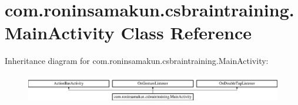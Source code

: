 \section{com.\+roninsamakun.\+csbraintraining.\+Main\+Activity Class Reference}
\label{classcom_1_1roninsamakun_1_1csbraintraining_1_1_main_activity}
Inheritance diagram for com.\+roninsamakun.\+csbraintraining.\+Main\+Activity\+:\begin{figure}[H]
\begin{center}
\leavevmode
\includegraphics[height=1.300813cm]{classcom_1_1roninsamakun_1_1csbraintraining_1_1_main_activity}
\end{center}
\end{figure}
